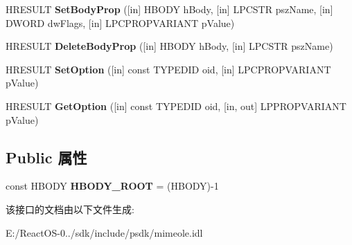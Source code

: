 \begin{DoxyCompactItemize}
\mbox{\label{interface_m_i_m_e_o_l_e_1_1_i_mime_message_tree_a82e50a243dfbeb3cf5af66d34e2182cd}} 
H\+R\+E\+S\+U\+LT {\bfseries Set\+Body\+Prop} (\mbox{[}in\mbox{]} H\+B\+O\+DY h\+Body, \mbox{[}in\mbox{]} L\+P\+C\+S\+TR psz\+Name, \mbox{[}in\mbox{]} D\+W\+O\+RD dw\+Flags, \mbox{[}in\mbox{]} L\+P\+C\+P\+R\+O\+P\+V\+A\+R\+I\+A\+NT p\+Value)
\item 
\mbox{\label{interface_m_i_m_e_o_l_e_1_1_i_mime_message_tree_a61cef1e9fb4a9efaf63c9020e635d69b}} 
H\+R\+E\+S\+U\+LT {\bfseries Delete\+Body\+Prop} (\mbox{[}in\mbox{]} H\+B\+O\+DY h\+Body, \mbox{[}in\mbox{]} L\+P\+C\+S\+TR psz\+Name)
\item 
\mbox{\label{interface_m_i_m_e_o_l_e_1_1_i_mime_message_tree_a4b7daf34f09f9dc8dd5bfa26dfc46b57}} 
H\+R\+E\+S\+U\+LT {\bfseries Set\+Option} (\mbox{[}in\mbox{]} const T\+Y\+P\+E\+D\+ID oid, \mbox{[}in\mbox{]} L\+P\+C\+P\+R\+O\+P\+V\+A\+R\+I\+A\+NT p\+Value)
\item 
\mbox{\label{interface_m_i_m_e_o_l_e_1_1_i_mime_message_tree_a79190095f67ea1131361fb387254591c}} 
H\+R\+E\+S\+U\+LT {\bfseries Get\+Option} (\mbox{[}in\mbox{]} const T\+Y\+P\+E\+D\+ID oid, \mbox{[}in, out\mbox{]} L\+P\+P\+R\+O\+P\+V\+A\+R\+I\+A\+NT p\+Value)
\end{DoxyCompactItemize}
\subsection*{Public 属性}
\begin{DoxyCompactItemize}
\item 
\mbox{\label{interface_m_i_m_e_o_l_e_1_1_i_mime_message_tree_a019e00c9f18f4e8cd67202696802f980}} 
const H\+B\+O\+DY {\bfseries H\+B\+O\+D\+Y\+\_\+\+R\+O\+OT} = (H\+B\+O\+DY)-\/1
\end{DoxyCompactItemize}


该接口的文档由以下文件生成\+:\begin{DoxyCompactItemize}
\item 
E\+:/\+React\+O\+S-\/0../sdk/include/psdk/mimeole.\+idl\end{DoxyCompactItemize}
